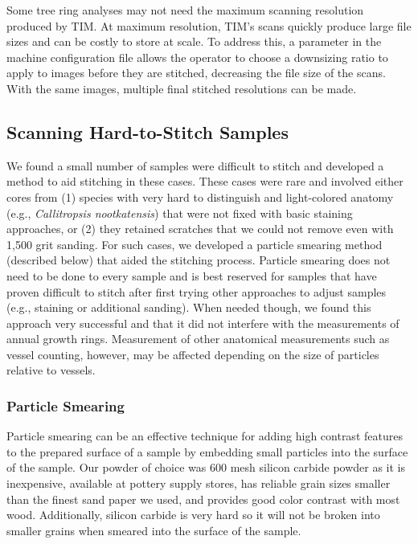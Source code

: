 \documentclass[a4paper,12pt]{article}
\newcommand{\R}[1]{\label{#1}\linelabel{#1}}
\begin{document}
Some tree ring analyses may not need the maximum scanning resolution produced by TIM. At maximum resolution, TIM's scans quickly produce large file sizes and can be costly to store at scale. 
To address this, a parameter in the machine configuration file allows the operator to choose a downsizing ratio to apply to images before they are stitched, decreasing the file size of the scans.
With the same images, multiple final stitched resolutions can be made. 

\subsection{Scanning Hard-to-Stitch Samples} 

\R{particle_smearing_1}
We found a small number of samples were difficult to stitch and developed a method to aid stitching in these cases. These cases were rare and involved either cores from (1) species with very hard to distinguish and light-colored anatomy (e.g., \emph{Callitropsis nootkatensis}) that were not fixed with basic staining approaches, or (2) they retained scratches that we could not remove even with 1,500 grit sanding. For such cases, we developed a particle smearing method (described below) that aided the stitching process. Particle smearing does not need to be done to every sample and is best reserved for samples that have proven difficult to stitch after first trying other approaches to adjust samples (e.g., staining or additional sanding). When needed though, we found this approach very successful and that it did not interfere with the measurements of annual growth rings. Measurement of other anatomical measurements such as vessel counting, however, may be affected depending on the size of particles relative to vessels. 
\R{particle_smearing_2}

\subsubsection{Particle Smearing}

Particle smearing can be an effective technique for adding high contrast features to the prepared surface of a sample by embedding small particles into the surface of the sample. 
Our powder of choice was 600 mesh silicon carbide powder as it is inexpensive, available at pottery supply stores, has reliable grain sizes smaller than the finest sand paper we used, and provides good color contrast with most wood. 
Additionally, silicon carbide is very hard so it will not be broken into smaller grains when smeared into the surface of the sample. 
\end{document}
